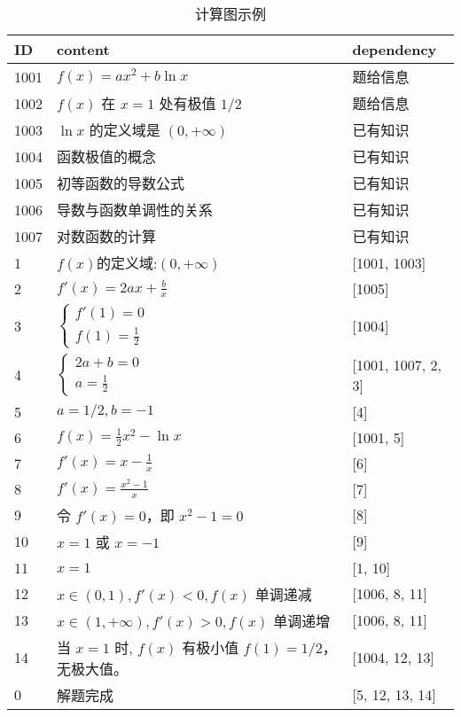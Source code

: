 \begin{table}
    \centering
    \caption{计算图示例}
    \begin{tabular}{lll}
        \toprule
        \textbf{ID} & \textbf{content} & \textbf{dependency} \\
        \midrule
        1001 & $f(x) = ax^2 + b \ln x$ & 题给信息 \\
        1002 & $f(x)$ 在 $x=1$ 处有极值 $1/2$ & 题给信息 \\
        1003 & $\ln x$ 的定义域是 $(0, +\infty)$ & 已有知识 \\
        1004 & 函数极值的概念 & 已有知识 \\
        1005 & 初等函数的导数公式 & 已有知识 \\
        1006 & 导数与函数单调性的关系 & 已有知识 \\
        1007 & 对数函数的计算 & 已有知识 \\
        1 & $f(x)$的定义域:$(0,+\infty)$ & [1001, 1003] \\
        2 & $f'(x)=2 a x+\frac{b}{x}$ & [1005] \\
        3 & $\left\{\begin{array}{l}f'(1)=0 \\ f(1)=\frac{1}{2}\end{array} \right.$ & [1004] \\
        4 & $\left\{\begin{array}{l}2 a+b=0 \\ a =\frac{1}{2}\end{array}\right.$ & [1001, 1007, 2, 3] \\
        5 & $a = 1/2, b = -1$ & [4] \\
        6 & $f(x) = \frac{1}{2}x^2 - \ln x$ & [1001, 5] \\
        7 & $f'(x) = x - \frac{1}{x}$ & [6] \\
        8 & $f'(x) = \frac{x^2-1}{x}$ & [7] \\
        9 & 令 $f'(x)=0$，即 $x^2-1=0$ & [8] \\
        10 & $x = 1$ 或 $x = -1$ & [9] \\
        11 & $x = 1$ & [1, 10] \\
        12 & $x \in(0,1), f'(x)<0, f(x)$ 单调递减 & [1006, 8, 11] \\
        13 & $x \in(1,+\infty), f'(x)>0, f(x)$ 单调递增 & [1006, 8, 11] \\
        14 & 当 $x=1$ 时, $f(x)$ 有极小值 $f(1) = 1/2$，无极大值。 & [1004, 12, 13] \\
        0 & 解题完成 & [5, 12, 13, 14] \\
        \bottomrule
    \end{tabular}
    \label{tab:computation_graph}
\end{table}